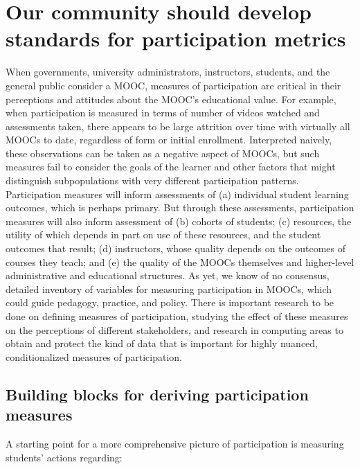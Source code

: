 \section{Our community should develop standards for participation metrics}




When governments, university administrators, instructors, students, and
the general public consider a MOOC, measures of participation are
critical in their perceptions and attitudes about the MOOC's educational
value. For example, when participation is measured in terms of number of
videos watched and assessments taken, there appears to be large
attrition over time with virtually all MOOCs to date, regardless of form
or initial enrollment. Interpreted naively, these observations can be
taken as a negative aspect of MOOCs, but such measures fail to consider
the goals of the learner and other factors that might distinguish
subpopulations with very different participation patterns.
Participation measures will inform assessments of (a) individual student
learning outcomes, which is perhaps primary. But through these
assessments, participation measures will also inform assessment of (b)
cohorts of students; (c) resources, the utility of which depends in part
on use of these resources, and the student outcomes that result; (d)
instructors, whose quality depends on the outcomes of courses they
teach; and (e) the quality of the MOOCs themselves and higher-level
administrative and educational structures.  As yet, we know of no
consensus, detailed inventory of variables for measuring participation
in MOOCs, which could guide pedagogy, practice, and policy. There is
important research to be done on defining measures of participation,
studying the effect of these measures on the perceptions of different
stakeholders, and research in computing areas to obtain and protect the
kind of data that is important for highly nuanced, conditionalized
measures of participation.  

\subsection{Building blocks for deriving participation measures}

A starting point for a more comprehensive picture of
participation is measuring students' actions regarding: 

